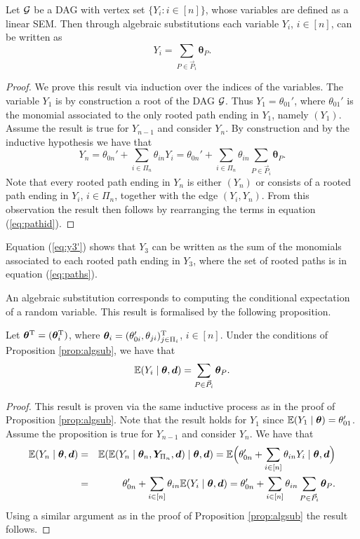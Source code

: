 \begin{proposition}
\label{prop:algsub}
Let $\mathcal{G}$ be a DAG with vertex set $\{Y_i:i\in[n]\}$, whose variables are defined as a linear SEM. Then through algebraic substitutions each variable $Y_i$, $i\in[n]$, can be written as
\begin{equation*}
Y_i=\sum_{P\in\vec{P}_i}\bm{\theta}_{P}.
\end{equation*}
\end{proposition}
\begin{proof}
We prove this result via induction over the indices of the variables. The variable $Y_1$ is by construction a root of the DAG $\mathcal{G}$. Thus $Y_1=\theta_{01}'$, where $\theta_{01}'$ is the monomial associated to the only rooted path ending in $Y_1$, namely $(Y_1)$. Assume the result is true for $Y_{n-1}$ and consider $Y_{n}$. By construction and by the inductive hypothesis we have that  
\begin{equation}
Y_{n}=\theta_{0n}'+\sum_{i\in \Pi_n}\theta_{in}Y_i=\theta_{0n}'+\sum_{i\in \Pi_n}\theta_{in}\sum_{P\in \vec{P}_i}\bm{\theta}_P.
\label{eq:pathid}
\end{equation}
Note that every rooted path ending in $Y_n$ is either $(Y_n)$ or consists of a rooted path ending in $Y_i$, $i\in \Pi_n$, together with the edge $(Y_i,Y_n)$. From this observation the result then follows by rearranging the terms in equation (\ref{eq:pathid}).
\end{proof}
\begin{example}
Equation (\ref{eq:y3'}) shows that $Y_3$ can be written as the sum of the monomials associated to each rooted path ending in $Y_3$, where the set of rooted paths is in equation (\ref{eq:paths}).
\end{example}

An algebraic substitution corresponds to computing the conditional expectation of a random variable. This result is formalised by the following proposition.

\begin{proposition}
\label{prop:condex}
Let $\bm{\theta}^{\textnormal{T}}=(\bm{\theta}_i^{\textnormal{T}})$, where $\bm{\theta}_{i}=(\theta_{0i}',\theta_{ji})_{j\in \Pi_i}^{\textnormal{T}}$, $i\in[n]$. Under the conditions of Proposition \ref{prop:algsub}, we have that 
\[
\mathbb{E}(Y_i\;|\;\bm{\theta},\bm{d})=\sum_{P\in\vec{P}_i}\bm{\theta}_P.
\]
\begin{proof}
This result is proven via the same inductive process as in the proof of Proposition \ref{prop:algsub}. Note that the result holds for $Y_1$ since $\mathbb{E}(Y_1\;|\;\bm{\theta})=\theta_{01}'$. Assume the proposition is true for $Y_{n-1}$ and consider $Y_n$. We have that 
\begin{eqnarray*}
\mathbb{E}(Y_n\;|\;\bm{\theta},\bm{d})&=&\mathbb{E}(\mathbb{E}(Y_n\;|\;\bm{\theta}_n,\bm{Y}_{\Pi_n},\bm{d})\;|\;\bm{\theta},\bm{d})=\mathbb{E}\Big(\theta_{0n}'+\sum_{i\in[n]}\theta_{in}Y_i\;|\;\bm{\theta},\bm{d}\Big)\\
&=&\theta_{0n}'+\sum_{i\in[n]}\theta_{in}\mathbb{E}(Y_i\;|\;\bm{\theta},\bm{d})=\theta_{0n}'+\sum_{i\in[n]}\theta_{in}\sum_{P\in\vec{P}_i}\bm{\theta}_P.
\end{eqnarray*}
Using a similar argument as in the proof of Proposition \ref{prop:algsub} the result follows.
\end{proof}
\end{proposition}
